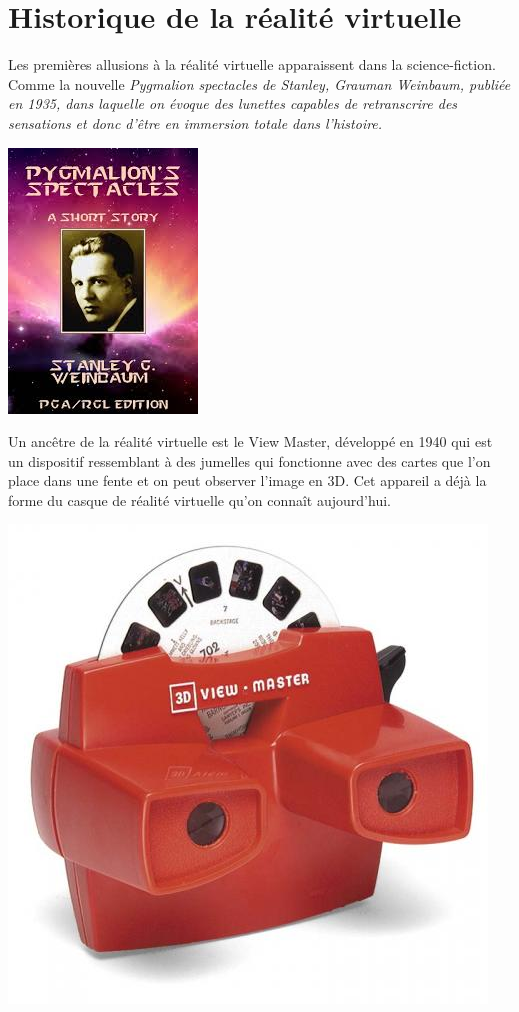 \documentclass[12pt, a4paper]{report}
\begin{document}
\section[Historique]{Historique de la réalité virtuelle}

Les premières allusions à la réalité virtuelle apparaissent dans la science-fiction. Comme la nouvelle \it{Pygmalion spectacles} de Stanley, Grauman Weinbaum, publiée en 1935, dans laquelle on évoque des lunettes capables de retranscrire des sensations et donc d'être en immersion totale dans l'histoire.

\newpage{}

\begin{center}
\includegraphics[scale=0.3]{pygmalion.jpeg}
\end{center}

Un ancêtre de la réalité virtuelle est le View Master, développé en 1940 qui est un dispositif ressemblant à des jumelles qui fonctionne avec des cartes que l'on place dans une fente et on peut observer l'image en 3D. Cet appareil a déjà la forme du casque de réalité virtuelle qu'on connaît aujourd'hui.

\begin{center}
\includegraphics[scale=0.18]{viewmaster.jpg}
\end{center}
\end{document}

